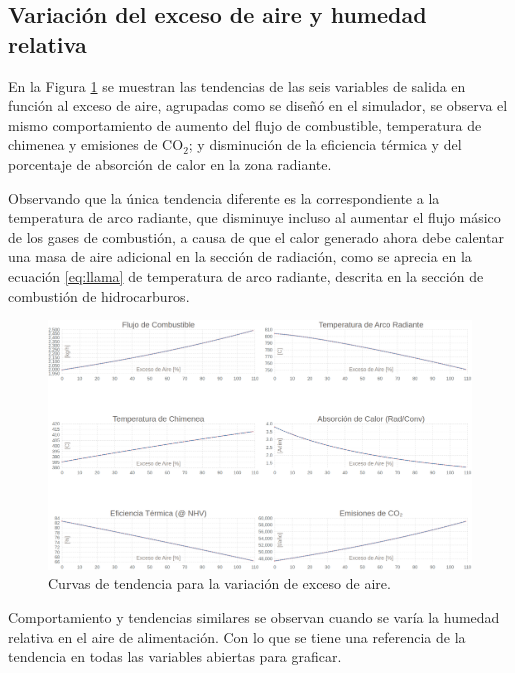 \subsection{Variación del exceso de aire y humedad relativa}
\par En la Figura \ref{fig:exceso-aire} se muestran las tendencias de las seis variables de salida en función al exceso de aire, agrupadas como se diseñó en el simulador, se observa el mismo comportamiento de aumento del flujo de combustible, temperatura de chimenea y emisiones de CO$_2$; y disminución de la eficiencia térmica y del porcentaje de absorción de calor en la zona radiante.
\par Observando que la única tendencia diferente es la correspondiente a la temperatura de arco radiante, que disminuye incluso al aumentar el flujo másico de los gases de combustión, a causa de que el calor generado ahora debe calentar una masa de aire adicional en la sección de radiación, como se aprecia en la ecuación \ref{eq:llama} de temperatura de arco radiante, descrita en la sección de combustión de hidrocarburos.
\begin{figure}[H] \begin{center} \includegraphics[scale=0.249]{images/exceso-aire}
\caption[Curvas de tendencia para la variación de exceso de aire]
{Curvas de tendencia para la variación de exceso de aire.}
\label{fig:exceso-aire} \end{center} \end{figure}
\par Comportamiento y tendencias similares se observan cuando se varía la humedad relativa en el aire de alimentación. Con lo que se tiene una referencia de la tendencia en todas las variables abiertas para graficar.

